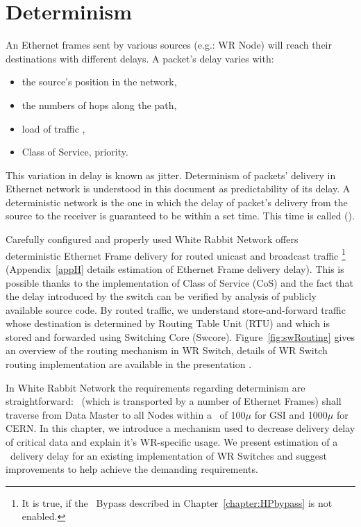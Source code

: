 \chapter{Determinism} 
\label{jitterDeterminismNetworkDimention}

An Ethernet frames sent by various sources (e.g.: WR Node) will reach their
destinations with different delays. A packet's delay varies with:
\begin{itemize}
  \item the source's position in the network,
  \item the numbers of hops along the path,
  \item load of traffic ,
  \item Class of Service, priority.
\end{itemize}
This variation in delay is known as jitter. Determinism of packets' delivery in
Ethernet network is understood in this document as predictability of its delay.
A deterministic network is the one in which the delay of packet's delivery from
the source to the receiver is guaranteed to be within a set time. This time is
called \GranularityWindow (\GW). 

Carefully configured and properly used White Rabbit Network offers
deterministic Ethernet Frame delivery for routed unicast and broadcast traffic
\footnote{It is true, if the \HP\ Bypass described in
Chapter~\ref{chapter:HPbypass} is not enabled.}
(Appendix~\ref{appH} details estimation of Ethernet Frame delivery delay). This
is possible thanks to the implementation of Class of Service (CoS) and the fact
that the delay introduced by the switch can be verified by analysis of publicly
available source code. By routed traffic, we understand store-and-forward
traffic whose destination is determined by Routing Table Unit (RTU) and which is
stored and forwarded using Switching Core (Swcore). Figure~\ref{fig:swRouting}
gives an overview of the routing mechanism in WR Switch, details of WR Switch
routing implementation are available in the
presentation \cite{HWpresentation}.




In White Rabbit Network the requirements regarding determinism are
straightforward: \ControlMessage\ (which is transported by a number of Ethernet
Frames) shall traverse from Data Master to all Nodes within a \GW\ of 100$\mu$
for GSI and 1000$ \mu$ for CERN. In this chapter, we introduce a mechanism used
to decrease delivery delay of critical data and explain it's WR-specific usage.
We present estimation of a \ControlMessage\ delivery delay for an existing
implementation of WR Switches and suggest improvements to help achieve the
demanding requirements.

